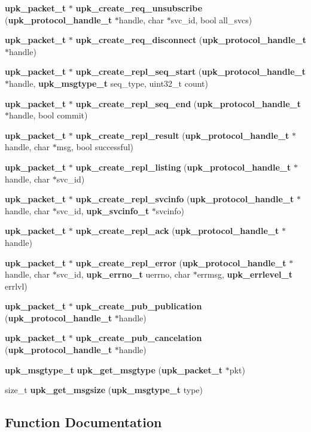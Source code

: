 \begin{DoxyCompactItemize}
\item 
{\bf upk\_\-packet\_\-t} $\ast$ {\bf upk\_\-create\_\-req\_\-unsubscribe} ({\bf upk\_\-protocol\_\-handle\_\-t} $\ast$handle, char $\ast$svc\_\-id, bool all\_\-svcs)
\item 
{\bf upk\_\-packet\_\-t} $\ast$ {\bf upk\_\-create\_\-req\_\-disconnect} ({\bf upk\_\-protocol\_\-handle\_\-t} $\ast$handle)
\item 
{\bf upk\_\-packet\_\-t} $\ast$ {\bf upk\_\-create\_\-repl\_\-seq\_\-start} ({\bf upk\_\-protocol\_\-handle\_\-t} $\ast$handle, {\bf upk\_\-msgtype\_\-t} seq\_\-type, uint32\_\-t count)
\item 
{\bf upk\_\-packet\_\-t} $\ast$ {\bf upk\_\-create\_\-repl\_\-seq\_\-end} ({\bf upk\_\-protocol\_\-handle\_\-t} $\ast$handle, bool commit)
\item 
{\bf upk\_\-packet\_\-t} $\ast$ {\bf upk\_\-create\_\-repl\_\-result} ({\bf upk\_\-protocol\_\-handle\_\-t} $\ast$handle, char $\ast$msg, bool successful)
\item 
{\bf upk\_\-packet\_\-t} $\ast$ {\bf upk\_\-create\_\-repl\_\-listing} ({\bf upk\_\-protocol\_\-handle\_\-t} $\ast$handle, char $\ast$svc\_\-id)
\item 
{\bf upk\_\-packet\_\-t} $\ast$ {\bf upk\_\-create\_\-repl\_\-svcinfo} ({\bf upk\_\-protocol\_\-handle\_\-t} $\ast$handle, char $\ast$svc\_\-id, {\bf upk\_\-svcinfo\_\-t} $\ast$svcinfo)
\item 
{\bf upk\_\-packet\_\-t} $\ast$ {\bf upk\_\-create\_\-repl\_\-ack} ({\bf upk\_\-protocol\_\-handle\_\-t} $\ast$handle)
\item 
{\bf upk\_\-packet\_\-t} $\ast$ {\bf upk\_\-create\_\-repl\_\-error} ({\bf upk\_\-protocol\_\-handle\_\-t} $\ast$handle, char $\ast$svc\_\-id, {\bf upk\_\-errno\_\-t} uerrno, char $\ast$errmsg, {\bf upk\_\-errlevel\_\-t} errlvl)
\item 
{\bf upk\_\-packet\_\-t} $\ast$ {\bf upk\_\-create\_\-pub\_\-publication} ({\bf upk\_\-protocol\_\-handle\_\-t} $\ast$handle)
\item 
{\bf upk\_\-packet\_\-t} $\ast$ {\bf upk\_\-create\_\-pub\_\-cancelation} ({\bf upk\_\-protocol\_\-handle\_\-t} $\ast$handle)
\item 
{\bf upk\_\-msgtype\_\-t} {\bf upk\_\-get\_\-msgtype} ({\bf upk\_\-packet\_\-t} $\ast$pkt)
\item 
size\_\-t {\bf upk\_\-get\_\-msgsize} ({\bf upk\_\-msgtype\_\-t} type)
\end{DoxyCompactItemize}


\subsection{Function Documentation}

